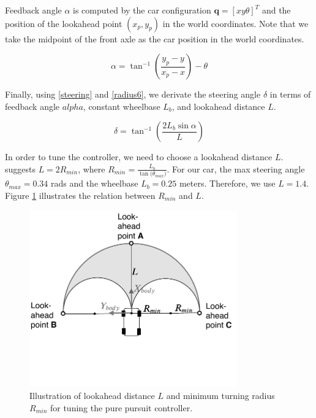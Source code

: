 Feedback angle $\alpha$ is computed by the car configuration $\textbf{q} = [x y
\theta]^T$ and the position of the lookahead point $(x_p, y_p)$ in the world
coordinates. Note that we take the midpoint of the front axle as the car
position in the world coordinates.

\begin{equation}
    \alpha = \tan^{-1}(\frac{y_p - y}{x_p - x}) - \theta
\label{eq:alpha}
\end{equation}

Finally, using \eqref{steering} and \eqref{radius6}, we derivate the steering
angle $\delta$ in terms of feedback angle $alpha$, constant wheelbase $L_b$,
and lookahead distance $L$.

\begin{equation}
    \delta = \tan^{-1}(\frac{2L_b\sin\alpha}{L})
\label{eq:delta}
\end{equation}

In order to tune the controller, we need to choose a lookahead distance $L$.
\cite{cite18} suggests $L = 2R_{min}$, where $R_{min} =
\frac{L_b}{\tan({\theta_{max})}}$. For our car, the max steering angle
$\theta_{max} = 0.34$ rads and the wheelbase $L_b = 0.25$ meters. Therefore, we
use $L = 1.4$. Figure \ref{figure:lookahead} illustrates the relation between
$R_{min}$ and $L$.


\begin{figure}[h]
  \centering
  \includegraphics[width=0.8\textwidth]{figures/pure-pursuit-lookahead.pdf}
  \caption{Illustration of lookahead distance $L$ and minimum turning radius
  $R_{min}$ for tuning the pure pursuit controller.}
  \label{figure:lookahead}
\end{figure}

